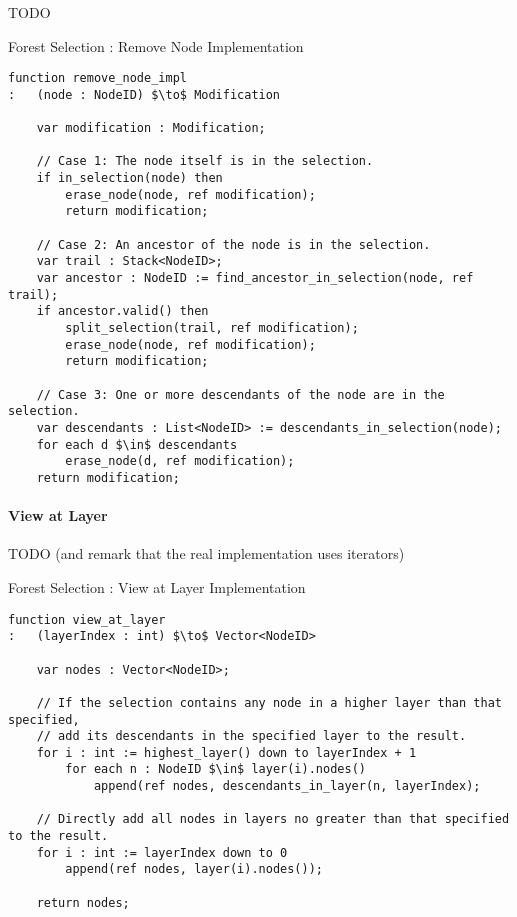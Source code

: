 TODO

\begin{stulisting}[p]
\caption{Forest Selection : Remove Node Implementation}
\label{code:ipfs-selection-removenodeimpl}
\begin{lstlisting}[style=Default]
function remove_node_impl
:	(node : NodeID) $\to$ Modification

	var modification : Modification;

	// Case 1: The node itself is in the selection.
	if in_selection(node) then
		erase_node(node, ref modification);
		return modification;

	// Case 2: An ancestor of the node is in the selection.
	var trail : Stack<NodeID>;
	var ancestor : NodeID := find_ancestor_in_selection(node, ref trail);
	if ancestor.valid() then
		split_selection(trail, ref modification);
		erase_node(node, ref modification);
		return modification;

	// Case 3: One or more descendants of the node are in the selection.
	var descendants : List<NodeID> := descendants_in_selection(node);
	for each d $\in$ descendants
		erase_node(d, ref modification);
	return modification;
\end{lstlisting}
\end{stulisting}

\paragraph{View at Layer}

TODO (and remark that the real implementation uses iterators)

\begin{stulisting}[p]
\caption{Forest Selection : View at Layer Implementation}
\label{code:ipfs-selection-viewatlayer}
\begin{lstlisting}[style=Default]
function view_at_layer
:	(layerIndex : int) $\to$ Vector<NodeID>

	var nodes : Vector<NodeID>;

	// If the selection contains any node in a higher layer than that specified,
	// add its descendants in the specified layer to the result.
	for i : int := highest_layer() down to layerIndex + 1
		for each n : NodeID $\in$ layer(i).nodes()
			append(ref nodes, descendants_in_layer(n, layerIndex);

	// Directly add all nodes in layers no greater than that specified to the result.
	for i : int := layerIndex down to 0
		append(ref nodes, layer(i).nodes());

	return nodes;
\end{lstlisting}
\end{stulisting}

